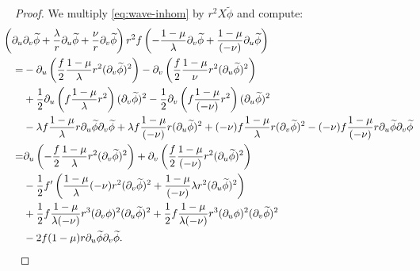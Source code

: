 \documentclass[10pt, reqno]{amsart}
\theoremstyle{definition}
\theoremstyle{remark}
\theoremstyle{conjecture}
\numberwithin{equation}{section}
\newcommand{\rd}{\partial}
\newcommand{\0}{\emptyset}
\newcommand{\lmb}{\lambda}
\newcommand{\dur}{\nu}
\newcommand{\dvr}{\lmb}
\newcommand{\phibg}{\overline{\phi}}				%
\newcommand{\phidf}{\widetilde{\phi}}				%
\begin{document}
\begin{proof}
We multiply \eqref{eq:wave-inhom} by $r^{2} X\phidf$ and compute:
\begin{align*}
& \hskip-2em
	\left(\rd_{u} \rd_{v} \phidf + \frac{\dvr}{r} \rd_{u} \phidf + \frac{\dur}{r} \rd_{v} \phidf \right) r^{2} f \left( - \frac{1-\mu}{\dvr} \rd_{v} \phidf + \frac{1-\mu}{(-\dur)} \rd_{u} \phidf \right) \\
	= & - \rd_{u} \left( \frac{f}{2} \frac{1-\mu}{\dvr} r^{2} (\rd_{v} \phidf)^{2}\right) 
		- \rd_{v} \left( \frac{f}{2} \frac{1-\mu}{\dur} r^{2} (\rd_{u} \phidf)^{2} \right) \\
	& + \frac{1}{2} \rd_{u}\left( f \frac{1-\mu}{\dvr} r^{2} \right) (\rd_{v} \phidf)^{2} 
	- \frac{1}{2} \rd_{v} \left( f \frac{1-\mu}{(-\dur)} r^{2} \right) (\rd_{u} \phidf)^{2} \\
	& - \dvr f \frac{1-\mu}{\dvr} r \rd_{u} \phidf \rd_{v} \phidf + \dvr f \frac{1-\mu}{(-\dur)} r (\rd_{u} \phidf)^{2} 
	 + (-\dur) f \frac{1-\mu}{\dvr} r (\rd_{v} \phidf)^{2} - (-\dur) f \frac{1-\mu}{(-\dur)} r \rd_{u} \phidf \rd_{v} \phidf \\
	= & \rd_{u} \left( - \frac{f}{2} \frac{1-\mu}{\dvr} r^{2} (\rd_{v} \phidf)^{2}\right) + \rd_{v} \left( \frac{f}{2} \frac{1-\mu}{(-\dur)} r^{2} (\rd_{u} \phidf)^{2} \right)  \\
	& - \frac{1}{2} f' \left( \frac{1-\mu}{\dvr} (-\dur) r^{2} (\rd_{v} \phidf)^{2} + \frac{1-\mu}{(-\dur)} \dvr r^{2} (\rd_{u} \phidf)^{2} \right) \\
	& + \frac{1}{2} f \frac{1-\mu}{\dvr (-\dur)}  r^{3} (\rd_{v} \phi)^{2} (\rd_{u} \phidf)^{2} 
	+ \frac{1}{2} f \frac{1-\mu}{\dvr (-\dur)}  r^{3} (\rd_{u} \phi)^{2} (\rd_{v} \phidf)^{2} \\
	& - 2 f (1-\mu) r \rd_{u} \phidf \rd_{v} \phidf.
\end{align*}


\end{proof}
\end{document}
